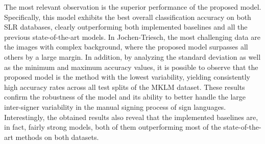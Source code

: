\begin{table}[t]
    \centering
    \caption{Classification accuracy (\%) of the proposed adversarial method and baselines on Jochen-Triesch and MKLM datasets.}
    \label{tab:adv_signer_inv_results}
\end{table}

The most relevant observation is the superior performance of the proposed model. Specifically, this model exhibits the best overall classification accuracy on both SLR databases, clearly outperforming both implemented baselines and all the previous state-of-the-art models. In Jochen-Triesch, the most challenging data are the images with complex background, where the proposed model surpasses all others by a large margin. In addition, by analyzing the standard deviation as well as the minimum and maximum accuracy values, it is possible to observe that the proposed model is the method with the lowest variability, yielding consistently high accuracy rates across all test splits of the MKLM dataset. These results confirm the robustness of the model and its ability to better handle the large inter-signer variability in the manual signing process of sign languages. Interestingly, the obtained results also reveal that the implemented baselines are, in fact, fairly strong models, both of them outperforming most of the state-of-the-art methods on both datasets.

